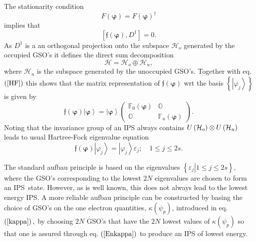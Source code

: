 \documentclass{preprint}
\begin{document}
The stationarity condition
\begin{equation}
F\left( \bm{\varphi}\right) =F\left( \bm{\varphi}\right) ^{\dagger}
\end{equation}
implies that
\begin{equation}
\left[ \mathfrak{f}\left( \bm{\varphi}\right) ,D^{1}\right] =0.  \label{HF}
\end{equation}
As $D^{1}$ is a an orthogonal projection onto the subspace $\mathcal{H}_{o}$
generated by the occupied GSO's it defines the direct sum decomposition
\begin{equation}
\mathcal{H=H}_{o}\oplus\mathcal{H}_{u},  \label{DS}
\end{equation}
where $\mathcal{H}_{u}$ is the subspace generated by the unoccupied GSO's.
Together with eq. $\left( \ref{HF}\right) $ this shows that the matrix
representation of $\mathfrak{f}\left( \bm{\varphi}\right) $ wrt the basis $%
\left\{ \left\vert \varphi_{j}\right\rangle \right\} $ is given by
\begin{equation}
\mathfrak{f}\left( \bm{\varphi}\right) \left\vert \bm{\varphi }\right\rangle
=\left\vert \bm{\varphi}\right\rangle \left(
\begin{array}{cc}
\mathbb{F}_{0}\left( \bm{\varphi}\right) & \mathbb{O} \\
\mathbb{O} & \mathbb{F}_{u}\left( \bm{\varphi}\right)%
\end{array}
\right) .
\end{equation}
Noting that the invariance group of an IPS always contains $U\left( \mathcal{%
H}_{o}\right) \otimes U\left( \mathcal{H}_{u}\right) $ leads to usual
Hartree-Fock eigenvalue equation
\begin{equation}
\mathfrak{f}\left( \bm{\varphi}\right) \left\vert \varphi_{j}\right\rangle
=\left\vert \varphi_{j}\right\rangle \varepsilon_{j};\quad1\leq j\leq2s.
\end{equation}

The standard aufbau principle is based on the eigenvalues $\left\{ \left.
\varepsilon_{j}\right\vert 1\leq j\leq2s\right\} ,$ where the GSO's
corresponding to the lowest $2N$ eigenvalues are chosen to form an IPS\
state. However, as is well known, this does not always lead to the lowest
energy IPS. A more reliable aufbau principle can be constructed by basing
the choice of GSO's on the one electron quantities, $\kappa\left(
\psi_{p}\right) $, introduced in eq. $\left( \ref{kappa}\right) ,$ by
choosing $2N$ GSO's that have the $2N$ lowest values of $\kappa\left(
\psi_{p}\right) $ so that one is assured through eq. $\left( \ref{Enkappa}%
\right) $ to produce an IPS of lowest energy.
\end{document}
